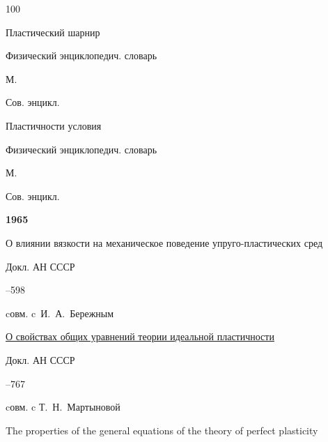 \begin{thebibliography}{100}

\paper Пластический шарнир 

\inbook Физический энциклопедич. словарь

\publaddr М.

\publ Сов. энцикл.






\paper Пластичности условия 

\inbook Физический энциклопедич. словарь

\publaddr М.

\publ Сов. энцикл.







\item[] \centerline{\bf 1965}




\paper О влиянии вязкости на механическое поведение упруго-пластических сред 

\jour Докл. АН СССР




–598 

\miscnote cовм. c~И.~А.~Бережным






\paper \href{https://zbmath.org/?q=an:0151.37603}{О свойствах общих уравнений теории идеальной пластичности}

\jour Докл. АН СССР




--767

\miscnote cовм. c Т.~Н.~Мартыновой


\transl


\paper The properties of the general equations of the theory of perfect plasticity


\end{thebibliography}
